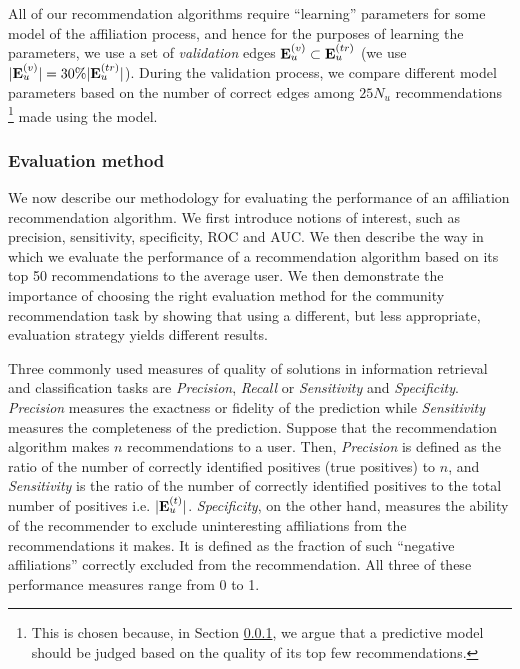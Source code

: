 \documentclass{sig-alternate}
\begin{document}
All of our recommendation algorithms require ``learning'' parameters for some model of the affiliation process, and hence for the purposes of learning the parameters, we use a set of \textit{validation} edges $\mathbf{E}_u^{(v)} \subset \mathbf{E}_u^{(tr)}$ (we use $|\mathbf{E}_u^{(v)}| = 30 \% |\mathbf{E}_u^{(tr)}|$). During the validation process, we compare different model parameters based on the number of correct edges among $25 N_u$ recommendations \footnote{This is chosen because, in Section \ref{Evaluation method}, we argue that a predictive model should be judged based on the quality of its top few recommendations.} made using the model.

\subsubsection{Evaluation method}
\label{Evaluation method}
We now describe our methodology for evaluating the performance of an affiliation recommendation algorithm. We first introduce notions of interest, such as precision, sensitivity, specificity, ROC and AUC. We then describe the way in which we evaluate the performance of a recommendation algorithm based on its top 50 recommendations to the average user. We then demonstrate the importance of choosing the right evaluation method for the community recommendation task by showing that using a different, but less appropriate, evaluation strategy yields different results.

Three commonly used measures of quality of solutions in information retrieval and classification tasks are \textit{Precision}, \textit{Recall} or \textit{Sensitivity} and \textit{Specificity}. \textit{Precision} measures the exactness or fidelity of the prediction while \textit{Sensitivity} measures the completeness of the prediction. Suppose that the recommendation algorithm makes $n$ recommendations to a user. Then, \textit{Precision} is defined as the ratio of the number of correctly identified positives (true positives) to $n$, and \textit{Sensitivity} is the ratio of the number of correctly identified positives to the total number of positives i.e. $|\mathbf{E}_u^{(t)}|$. \textit{Specificity}, on the other hand, measures the ability of the recommender to exclude uninteresting affiliations from the recommendations it makes. It is defined as the fraction of such ``negative affiliations'' correctly excluded from the recommendation. All three of these performance measures range from 0 to 1.
\end{document}

